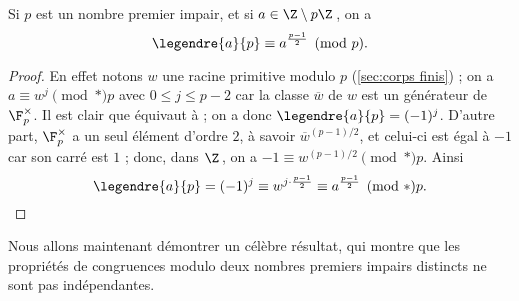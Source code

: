 \documentclass[11pt, %
  title in boldface,
  theorem in new line,
  theorem numbering = section,
  number theorems separately,
  simple name,
]{beaulivre}
\begin{document}
    \begin{proposition}\label{prop:critère d'Euler}
        Si \( p \) est un nombre premier impair, et si \( a \in \Z \setminus p\Z \)\,, on a
        \[
            \legendre{a}{p} \equiv a^{\frac{p-1}{2}} \pmod{p}.
        \]
        \vspace{-\baselineskip}
    \end{proposition}
    \begin{proof}
        En effet notons \( w \) une racine primitive modulo \( p \) (\cref{sec:corps finis}) ; on a \( a \equiv w^j \pmod*{p} \) avec \( 0 \leqslant j \leqslant p-2 \) car la classe \( \overline{w} \) de \( w \) est un générateur de \( \F_p^\times \). Il est clair que  équivaut à  ; on a donc \( \legendre{a}{p} = (-1)^j \). D'autre part, \( \F_p^\times \) a un seul élément d'ordre \( 2 \), à savoir \( \overline{w}^{(p-1)/2} \), et celui-ci est égal à \( -1 \) car son carré est \( 1 \) ; donc, dans \( \Z \)\,, on a \( -1 \equiv w^{(p-1)/2} \pmod*{p} \). Ainsi
        \vspace{-.3\baselineskip}
        \[
            \legendre{a}{p} = (-1)^j \equiv w^{j\cdot\frac{p-1}{2}} \equiv a^{\frac{p-1}{2}} \pmod*{p}.
            \qedhere
        \]
    \end{proof}

    Nous allons maintenant démontrer un célèbre résultat, qui montre que les propriétés de congruences modulo deux nombres premiers impairs distincts ne sont pas indépendantes.
\end{document}
